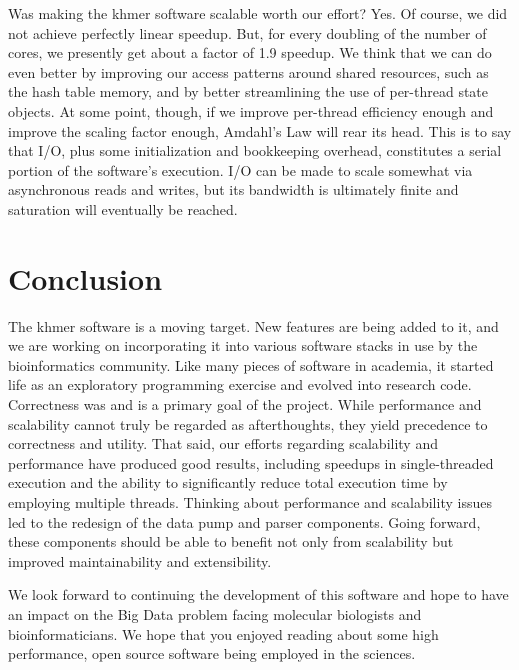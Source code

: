 \documentclass{article}
\begin{document}
Was making the khmer software scalable worth our effort? Yes. Of course, we did not achieve perfectly linear speedup. But, for every doubling of the number of cores, we presently get about a factor of 1.9 speedup. We think that we can do even better by improving our access patterns around shared resources, such as the hash table memory, and by better streamlining the use of per-thread state objects. At some point, though, if we improve per-thread efficiency enough and improve the scaling factor enough, Amdahl's Law \citep{web:Amdahl} will rear its head. This is to say that I/O, plus some initialization and bookkeeping overhead, constitutes a serial portion of the software's execution. I/O can be made to scale somewhat via asynchronous reads and writes, but its bandwidth is ultimately finite and saturation will eventually be reached.


\section{Conclusion}

The khmer software is a moving target. New features are being added to it, and we are working on incorporating it into various software stacks in use by the bioinformatics community. Like many pieces of software in academia, it started life as an exploratory programming exercise and evolved into research code. Correctness was and is a primary goal of the project. While performance and scalability cannot truly be regarded as afterthoughts, they yield precedence to correctness and utility. That said, our efforts regarding scalability and performance have produced good results, including speedups in single-threaded execution and the ability to significantly reduce total execution time by employing multiple threads. Thinking about performance and scalability issues led to the redesign of the data pump and parser components. Going forward, these components should be able to benefit not only from scalability but improved maintainability and extensibility.

We look forward to continuing the development of this software and hope to have an impact on the Big Data problem facing molecular biologists and bioinformaticians. We hope that you enjoyed reading about some high performance, open source software being employed in the sciences.



\end{document}
